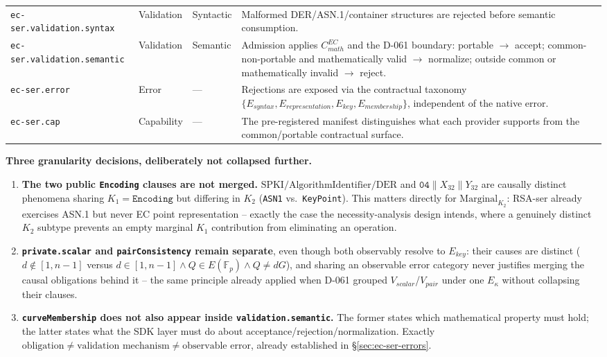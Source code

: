 \documentclass[11pt,a4paper]{article}
\begin{document}
\begin{longtable}{p{}p{}p{}p{}}
\texttt{ec-ser.validation.syntax} &
Validation &
Syntactic &
Malformed DER/ASN.1/container structures are rejected before semantic consumption.\\

\texttt{ec-ser.validation.semantic} &
Validation &
Semantic &
Admission applies $C_{math}^{EC}$ and the D-061 boundary: portable $\to$ accept; common-non-portable and mathematically valid $\to$ normalize; outside common or mathematically invalid $\to$ reject.\\

\texttt{ec-ser.error} &
Error &
--- &
Rejections are exposed via the contractual taxonomy $\{E_{syntax}, E_{representation}, E_{key}, E_{membership}\}$, independent of the native error.\\

\texttt{ec-ser.cap} &
Capability &
--- &
The pre-registered manifest distinguishes what each provider supports from the common/portable contractual surface.\\

\end{longtable}

\textbf{Three granularity decisions, deliberately not collapsed further.}

\begin{enumerate}
\item \textbf{The two public \texttt{Encoding} clauses are not merged.} $\text{SPKI}/\text{AlgorithmIdentifier}/\text{DER}$ and $\texttt{04}\|X_{32}\|Y_{32}$ are causally distinct phenomena sharing $K_1=\texttt{Encoding}$ but differing in $K_2$ (\texttt{ASN1} vs.\ \texttt{KeyPoint}). This matters directly for $\text{Marginal}_{K_2}$: RSA-ser already exercises ASN.1 but never EC point representation -- exactly the case the necessity-analysis design intends, where a genuinely distinct $K_2$ subtype prevents an empty marginal $K_1$ contribution from eliminating an operation.
\item \textbf{\texttt{private.scalar} and \texttt{pairConsistency} remain separate}, even though both observably resolve to $E_{key}$: their causes are distinct ($d\notin[1,n-1]$ versus $d\in[1,n-1]\wedge Q\in E(\mathbb{F}_p)\wedge Q\neq dG$), and sharing an observable error category never justifies merging the causal obligations behind it -- the same principle already applied when D-061 grouped $V_{scalar}$/$V_{pair}$ under one $E_\kappa$ without collapsing their clauses.
\item \textbf{\texttt{curveMembership} does not also appear inside \texttt{validation.semantic}.} The former states which mathematical property must hold; the latter states what the SDK layer must do about acceptance/rejection/normalization. Exactly $\text{obligation} \neq \text{validation mechanism} \neq \text{observable error}$, already established in \S\ref{sec:ec-ser-errors}.
\end{enumerate}
\end{document}
